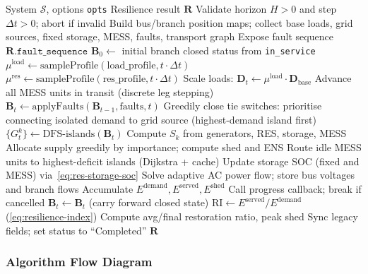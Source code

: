 \begin{algorithm}[H]
\caption{Multi-Hour Distribution Resilience Assessment}
\label{alg:resilience}
\begin{algorithmic}[1]
\Require System $\mathcal{S}$, options \texttt{opts}
\Ensure Resilience result $\mathbf{R}$
\State Validate horizon $H > 0$ and step $\Delta t > 0$; abort if invalid
\State Build bus/branch position maps; collect base loads, grid sources,
       fixed storage, MESS, faults, transport graph
\State Expose fault sequence $\mathbf{R}.\texttt{fault\_sequence}$
\State $\mathbf{B}_0 \leftarrow$ initial branch closed status from \texttt{in\_service}
  \State $\mu^{\text{load}} \leftarrow \text{sampleProfile}(\text{load\_profile}, t\cdot\Delta t)$
  \State $\mu^{\text{res}} \leftarrow \text{sampleProfile}(\text{res\_profile}, t\cdot\Delta t)$
  \State Scale loads: $\mathbf{D}_t \leftarrow \mu^{\text{load}}\cdot\mathbf{D}_{\text{base}}$
  \State Advance all MESS units in transit (discrete leg stepping)
  \State $\mathbf{B}_t \leftarrow \text{applyFaults}(\mathbf{B}_{t-1}, \text{faults}, t)$
    \State Greedily close tie switches: prioritise connecting isolated
           demand to grid source (highest-demand island first)
  \EndIf
  \State $\{G_t^k\} \leftarrow \text{DFS-islands}(\mathbf{B}_t)$
    \State Compute $S_k$ from generators, RES, storage, MESS
    \State Allocate supply greedily by importance; compute shed and ENS
  \EndFor
    \State Route idle MESS units to highest-deficit islands (Dijkstra + cache)
  \EndIf
  \State Update storage SOC (fixed and MESS) via~\eqref{eq:res-storage-soc}
    \State Solve adaptive AC power flow; store bus voltages and branch flows
  \EndIf
  \State Accumulate $E^{\text{demand}}, E^{\text{served}}, E^{\text{shed}}$
  \State Call progress callback; break if cancelled
  \State $\mathbf{B}_{t} \leftarrow \mathbf{B}_t$ (carry forward closed state)
\EndFor
\State $\mathrm{RI} \leftarrow E^{\text{served}} / E^{\text{demand}}$ (\eqref{eq:resilience-index})
\State Compute avg/final restoration ratio, peak shed
\State Sync legacy fields; set status to ``Completed''
\State \Return $\mathbf{R}$
\end{algorithmic}
\end{algorithm}

\subsubsection{Algorithm Flow Diagram}
\label{sec:resilience-flow}

